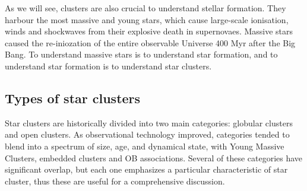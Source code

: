 


As we will see, clusters are also crucial to understand stellar formation. They harbour the most massive and young stars, which cause large-scale ionisation, winds and shockwaves from their explosive death in supernovaes. Massive stars caused the re-iniozation of the entire observable Universe 400 Myr after the Big Bang. To understand massive stars is to understand star formation, and to understand star formation is to understand star clusters.



%
%

\subsection{Types of star clusters}

Star clusters are historically divided into two main categories: globular clusters and open clusters. As observational technology improved, categories tended to blend into a spectrum of size, age, and dynamical state, with Young Massive Clusters, embedded clusters and OB associations. Several of these categories have significant overlap, but each one emphasizes a particular characteristic of star cluster, thus these are useful for a comprehensive discussion.


